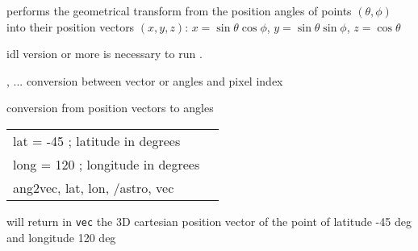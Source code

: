 \begin{codedescription}
{\facname performs the geometrical transform from the position angles of points 
$(\theta,\phi)$
into their position vectors $(x,y,z)$:
$x = \sin\theta\cos\phi$, $y=\sin\theta\sin\phi$, $z=\cos\theta$}
\end{codedescription}



\begin{related}
  \begin{sulist}{} %
    \item[idl] version \idlversion or more is necessary to run \facname.	
    \item[\htmlref{pix2xxx}{idl:pix_tools}, ... ] conversion between vector or angles and pixel index
    \item[\htmlref{vec2ang}{idl:vec2ang}] conversion from position vectors to angles
  \end{sulist}
\end{related}

\begin{example}
{
\begin{tabular}{ll} %
lat = -45 ; latitude in degrees \\
long = 120 ; longitude in degrees \\
ang2vec, lat, lon, /astro, vec
\end{tabular}
}
{will return in {\tt vec} the 3D cartesian position vector of the point of latitude -45 deg and longitude 120 deg
}
\end{example}

